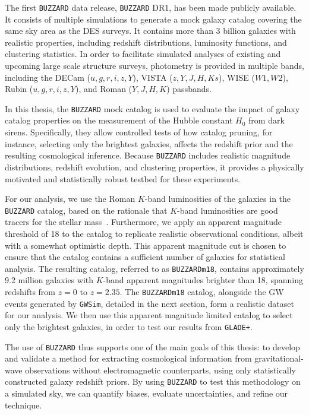 The first \texttt{BUZZARD} data release, \texttt{BUZZARD} DR1, has been made publicly available. It consists of multiple simulations to generate a mock galaxy catalog covering the same sky area as the \acf{DES} surveys. It contains more than 3 billion galaxies with realistic properties, including redshift distributions, luminosity functions, and clustering statistics. In order to facilitate simulated analyses of existing and upcoming large scale structure surveys, photometry is provided in multiple bands, including the DECam ($u,g,r,i,z,Y$), VISTA ($z,Y,J,H,Ks$), WISE ($W1,W2$), Rubin ($u,g,r,i,z,Y$), and Roman ($Y,J,H,K$) passbands.

In this thesis, the \texttt{BUZZARD} mock catalog is used to evaluate the impact of galaxy catalog properties on the measurement of the Hubble constant $H_0$ from dark sirens. Specifically, they allow controlled tests of how catalog pruning, for instance, selecting only the brightest galaxies, affects the redshift prior and the resulting cosmological inference. Because \texttt{BUZZARD} includes realistic magnitude distributions, redshift evolution, and clustering properties, it provides a physically motivated and statistically robust testbed for these experiments.

For our analysis, we use the Roman $K$-band luminosities of the galaxies in the \texttt{BUZZARD} catalog, based on the rationale that $K$-band luminosities are good tracers for the stellar mass~\citep{strazzullo2006near,sureshkumar2021galaxy}. Furthermore, we apply an apparent magnitude threshold of 18 to the catalog to replicate realistic observational conditions, albeit with a somewhat optimistic depth. This apparent magnitude cut is chosen to ensure that the catalog contains a sufficient number of galaxies for statistical analysis. The resulting catalog, referred to as \texttt{BUZZARDm18}, contains approximately 9.2 million galaxies with $K$-band apparent magnitudes brighter than 18, spanning redshifts from $z=0$ to $z=2.35$. The \texttt{BUZZARDm18} catalog, alongside the \ac{GW} events generated by \texttt{GWSim}, detailed in the next section, form a realistic dataset for our analysis. We then use this apparent magnitude limited catalog to select only the brightest galaxies, in order to test our results from \texttt{GLADE+}.

The use of \texttt{BUZZARD} thus supports one of the main goals of this thesis: to develop and validate a method for extracting cosmological information from gravitational-wave observations without electromagnetic counterparts, using only statistically constructed galaxy redshift priors. By using \texttt{BUZZARD} to test this methodology on a simulated sky, we can quantify biases, evaluate uncertainties, and refine our technique.


